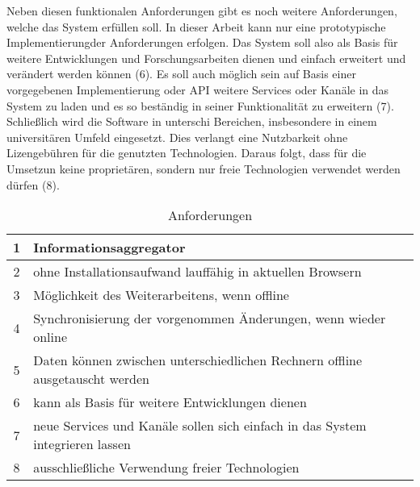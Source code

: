 Neben diesen funktionalen Anforderungen gibt es noch weitere Anforderungen, welche das System erfüllen soll. In dieser Arbeit kann nur eine prototypische Implementierungder Anforderungen erfolgen. Das System soll also als Basis für weitere Entwicklungen und Forschungsarbeiten dienen und einfach erweitert und verändert werden können (6). Es soll auch möglich sein auf Basis einer vorgegebenen Implementierung oder API weitere Services oder Kanäle in das System zu laden und es so beständig in seiner Funktionalität zu erweitern (7). Schließlich wird die Software in unterschi Bereichen, insbesondere in einem universitären Umfeld eingesetzt. Dies verlangt eine Nutzbarkeit ohne Lizengebühren für die genutzten Technologien. Daraus folgt, dass für die Umsetzun keine proprietären, sondern nur freie Technologien verwendet werden dürfen (8). 

\begin{table}[h]
\caption{Anforderungen}
\begin{tabular}{c || l}
1 & Informationsaggregator \\
\hline
2 & ohne Installationsaufwand lauffähig  in aktuellen Browsern \\
\hline
3 & Möglichkeit des Weiterarbeitens, wenn offline \\
\hline
4 & Synchronisierung der vorgenommen Änderungen, wenn wieder online \\
\hline
5 & Daten können zwischen unterschiedlichen Rechnern offline ausgetauscht werden \\
\hline
6 & kann als Basis für weitere Entwicklungen dienen\\
\hline
7 & neue Services und Kanäle sollen sich einfach in das System integrieren lassen  \\
\hline
8 & ausschließliche Verwendung freier Technologien \\
\hline
\end{tabular}
\label{table:anforderungen}
\end{table}
